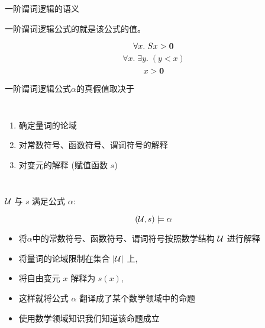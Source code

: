 
\begin{frame}{}
  \begin{center}
    一阶谓词逻辑的语义
  \end{center}
\end{frame}

\begin{frame}{}
  \begin{center}
    一阶谓词逻辑公式的就是该公式的值。

    \[
      \forall x.\; Sx > {\bf 0}
    \]
    \pause
    \[
      \forall x.\; \exists y.\; (y < x)
    \]
    \pause
    \[
      x > {\bf 0}
    \]

    \pause
    \vspace{0.60cm}
    一阶谓词逻辑公式$\alpha$的真假值取决于
    \begin{columns}
        \begin{enumerate}[(1)]
          \setlength{\itemsep}{6pt}
          \item 确定量词的论域
          \item 对常数符号、函数符号、谓词符号的解释
          \item 对变元的解释 (赋值函数 $s$)
        \end{enumerate}
    \end{columns}

    \pause
    \vspace{0.60cm}
  \end{center}
\end{frame}

\begin{frame}{}
  \begin{definition}
    \begin{center}
      $\mathcal{U}$ 与 $s$ 满足公式 $\alpha$:
    \end{center}
    \[
      (\mathcal{U}, s) \models \alpha
    \]
    \begin{itemize}
      \item 将$\alpha$中的常数符号、函数符号、谓词符号按照数学结构 $\mathcal{U}$ 进行解释
      \item 将量词的论域限制在集合 $|\mathcal{U}|$ 上,
      \item 将自由变元 $x$ 解释为 $s(x)$,
      \item 这样就将公式 $\alpha$ 翻译成了某个数学领域中的命题
      \item 使用数学领域知识我们知道该命题成立
    \end{itemize}
  \end{definition}
\end{frame}

